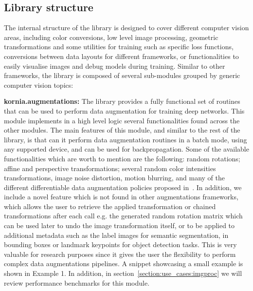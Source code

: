 \subsection{Library structure}
\label{section:kornia:library_structure}

The internal structure of the library is designed to cover different computer vision areas, including color conversions, low level image processing, geometric transformations and some utilities for training  such as specific  loss functions, conversions between data layouts for different frameworks, or functionalities to easily visualise images and debug models during   training. Similar to other frameworks, the library is composed of several sub-modules grouped by generic computer vision topics:

\newpage

\textbf{kornia.augmentations:} The library provides a fully functional set of routines that can be used to perform data augmentation for training deep networks. This module implements in a high level logic several functionalities found across the other modules. The main features of this  module, and similar to the rest of the library, is that can it perform data augmentation routines in a batch mode, using any supported device, and can be used for backpropagation. Some of the available functionalities which are worth to mention are the following: random rotations; affine and perspective transformations; several random color intensities transformations, image noise distortion, motion blurring, and many of the different differentiable data augmentation policies proposed in~\citep{DBLP:journals/corr/abs-2004-11966, huang20}. In addition, we include a novel feature which is not found in  other augmentations frameworks, which allows the user to retrieve the applied transformation or chained transformations after each call e.g. the generated random rotation matrix which can be used later to undo the image transformation itself, or to be applied to additional metadata such as the label images for semantic segmentation, in bounding boxes or landmark keypoints for object detection tasks. This is very valuable for research purposes since it gives  the user the flexibility to perform complex data augmentations pipelines. A snippet showcasing a small example is shown in Example 1. In addition, in section~\ref{section:use_cases:imgproc} we will review performance benchmarks for this module.

\vspace{.5cm}

